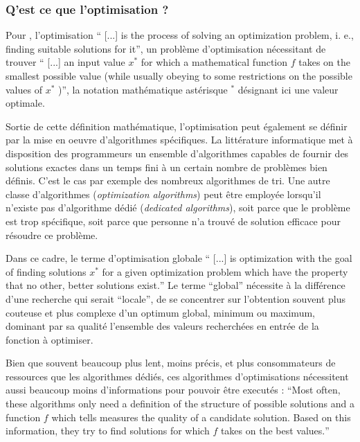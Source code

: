 \subsubsection{Q'est ce que l'optimisation ?}
\label{ssec:Optimisation}

Pour \textcite[22]{Weise2011}, l'optimisation \foreignquote{english}{ [...] is the process of solving an optimization problem, i. e., finding suitable solutions for it}, un problème d'optimisation nécessitant de trouver \foreignquote{english}{ [...] an input value $x^*$ for which a mathematical function $f$ takes on the smallest possible value (while usually obeying to some restrictions on the possible values of $x^*$ )}, la notation mathématique astérisque $^*$ désignant ici une valeur optimale.

Sortie de cette définition mathématique, l'optimisation peut également se définir par la mise en oeuvre d'algorithmes spécifiques. La littérature informatique met à disposition des programmeurs un ensemble d'algorithmes capables de fournir des solutions exactes dans un temps fini à un certain nombre de problèmes bien définis. C'est le cas par exemple des nombreux algorithmes de tri. Une autre classe d'algorithmes (\textit{optimization algorithms}) peut être employée lorsqu'il n'existe pas d'algorithme dédié (\textit{dedicated algorithms}), soit parce que le problème est trop spécifique, soit parce que personne n'a trouvé de solution efficace pour résoudre ce problème. 

Dans ce cadre, le terme d'optimisation globale \foreignquote{english}{ [...] is optimization with the goal of finding solutions $x^*$ for a given optimization problem which have the property that no other, better solutions exist.} Le terme \enquote{global} nécessite à la différence d'une recherche qui serait \enquote{locale}, de se concentrer sur l'obtention souvent plus couteuse et plus complexe d'un optimum global, minimum ou maximum, dominant par sa qualité l'ensemble des valeurs recherchées en entrée de la fonction à optimiser.

Bien que souvent beaucoup plus lent, moins précis, et plus consommateurs de ressources que les algorithmes dédiés, ces algorithmes d'optimisations nécessitent aussi beaucoup moins d'informations pour pouvoir être executés : \foreignquote{english}{Most often, these algorithms only need a definition of the structure of possible solutions and a function $f$ which tells measures the quality of a candidate solution. Based on this information, they try to find solutions for which $f$ takes on the best values.} \autocite[24]{Weise2011}


